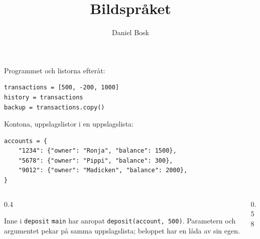 \documentclass[ignoreframetext]{beamer}
\begin{document}
\title{Bildspråket}
\author{Daniel Bosk}


\begin{frame}[fragile]
  \begin{example}
    Programmet och listorna efteråt:
    \begin{verbatim}
transactions = [500, -200, 1000]
history = transactions
backup = transactions.copy()
    \end{verbatim}
    \smallskip
    \centering
    \figAlias
  \end{example}
\end{frame}


\begin{frame}[fragile]
  Kontona, uppslagslistor i en uppslagslista:
    \begin{verbatim}
accounts = {
    "1234": {"owner": "Ronja", "balance": 1500},
    "5678": {"owner": "Pippi", "balance": 300},
    "9012": {"owner": "Madicken", "balance": 2000},
}
    \end{verbatim}
    \centering
    \figDictOfDicts
\end{frame}


\begin{frame}
  \begin{columns}[T]
    \begin{column}{0.4\textwidth}
      \begin{block}{Inne i \texttt{deposit}}
        \texttt{main} har anropat \texttt{deposit(account, 500)}.
        Parametern och argumentet pekar på samma uppslagslista;
        beloppet har en låda av sin egen.
      \end{block}
    \end{column}
    \begin{column}{0.58\textwidth}
      \figCall
    \end{column}
  \end{columns}
\end{frame}
\end{document}
